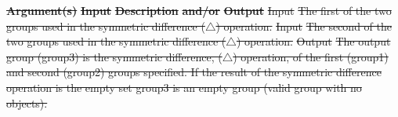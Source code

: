 \documentclass[12pt]{report} %
\providecommand{\DIFdeltex}[1]{{\protect\color{red}\sout{#1}}}                      %
\providecommand{\DIFdel}[1]{\texorpdfstring{\DIFdeltex{#1}}{}} %
\begin{document}
\textbf{\DIFdel{Argument(s)}} %
\textbf{\DIFdel{Input }}  %
\textbf{\DIFdel{Description}} %
\textbf{\DIFdel{and/or}}     %
\textbf{\DIFdel{Output}} %
\DIFdel{Input  }%
\DIFdel{The first of the two groups used in the symmetric difference ($\triangle$)  operation.   }%
\DIFdel{Input  }%
\DIFdel{The second of the two groups used in the symmetric difference ($\triangle$) operation.   }%
\DIFdel{Output  }%
\DIFdel{The output group (group3) is the symmetric difference, ($\triangle$) operation, of the first (group1) and second (group2) groups specified. If the result of the symmetric difference operation is the empty set group3 is an empty group (valid group with no objects).  }%
\end{document}
